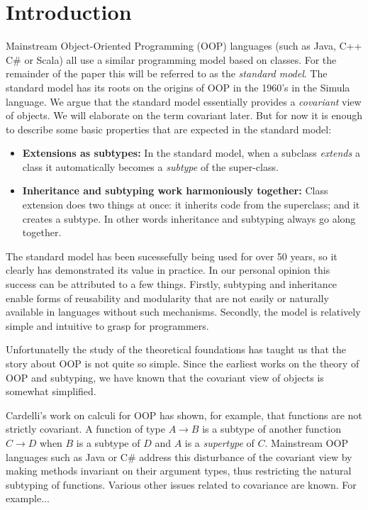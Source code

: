 \section{Introduction}

Mainstream Object-Oriented Programming (OOP) languages (such as Java,
C++ C\# or Scala) all use a similar programming model based on
classes. For the remainder of the paper this will be referred to as
the \emph{standard model}. The standard model has its roots on the
origins of OOP in the 1960's in the Simula~\cite{} language. We argue
that the standard model essentially provides a \emph{covariant} view of
objects. We will elaborate on the term covariant later. But for now
it is enough to describe some basic properties that are expected 
in the standard model:

\begin{itemize}

\item {\bf Extensions as subtypes:} In the standard model, when a 
subclass \emph{extends} a class it automatically becomes a 
\emph{subtype} of the super-class. 

\item{\bf Inheritance and subtyping work harmoniously together:}
Class extension does two things at once: it inherits code from the
superclass; and it creates a subtype. In other words inheritance and
subtyping always go along together. 

\end{itemize}

The standard model has been sucessefully being used for over 50 years,
so it clearly has demonstrated its value in practice. In our personal
opinion this success can be attributed to a few things. Firstly,
subtyping and inheritance enable forms of reusability and modularity 
that are not easily or naturally available in languages without such
mechanisms. Secondly, the model is relatively simple and intuitive 
to grasp for programmers. 

Unfortunatelly the study of the theoretical foundations has
taught us that the story about OOP is not quite so simple. Since the
earliest works on the theory of OOP and subtyping, we have known that 
the covariant view of objects is somewhat simplified. 

Cardelli's work on calculi for OOP has
shown, for example, that functions are not strictly covariant. 
A function of type $A \to B$ is a subtype of another function 
$C \to D$ when $B$ is a subtype of $D$ and $A$ is a \emph{supertype} 
of $C$. Mainstream OOP languages such as Java or C\# address this
disturbance of the covariant view by making methods invariant on 
their argument types, thus restricting the natural subtyping of
functions. Various other issues related to covariance are known. 
For example...

